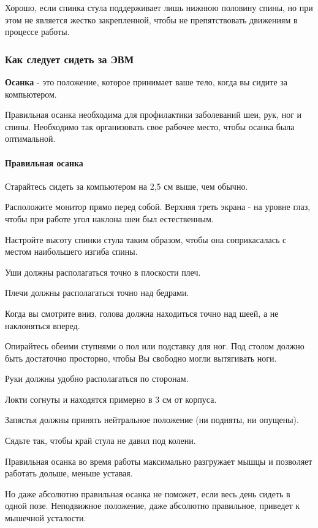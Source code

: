 \documentclass[russian,utf8,emptystyle]{eskdtext}
\begin{document}
\begin{spacing}{1.5}
Хорошо, если спинка стула поддерживает лишь нижнюю половину спины, но при этом не является жестко закрепленной, чтобы не препятствовать движениям в процессе работы. 

\subsubsection{Как следует сидеть за ЭВМ}

\textbf{Осанка} - это положение, которое принимает ваше тело, когда вы сидите за компьютером.

Правильная осанка необходима для профилактики заболеваний шеи, рук, ног и спины. Необходимо так организовать свое рабочее место, чтобы осанка была оптимальной.

\paragraph{Правильная осанка}
Старайтесь сидеть за компьютером на 2,5 см выше, чем обычно. 

Расположите монитор прямо перед собой. Верхняя треть экрана - на уровне глаз, чтобы при работе угол наклона шеи был естественным. 

Настройте высоту спинки стула таким образом, чтобы она соприкасалась с местом наибольшего изгиба спины. 

Уши должны располагаться точно в плоскости плеч. 

Плечи должны располагаться точно над бедрами. 

Когда вы смотрите вниз, голова должна находиться точно над шеей, а не наклоняться вперед. 

Опирайтесь обеими ступнями о пол или подставку для ног. Под столом должно быть достаточно просторно, чтобы Вы свободно могли вытягивать ноги. 

Руки должны удобно располагаться по сторонам. 

Локти согнуты и находятся примерно в 3 см от корпуса. 

Запястья должны принять нейтральное положение (ни подняты, ни опущены). 

Сядьте так, чтобы край стула не давил под колени. 

Правильная осанка во время работы максимально разгружает мышцы и позволяет работать дольше, меньше уставая. 

Но даже абсолютно правильная осанка не поможет, если весь день сидеть в одной позе. Неподвижное положение, даже абсолютно правильное, приведет к мышечной усталости. 


\end{spacing}
\end{document}

